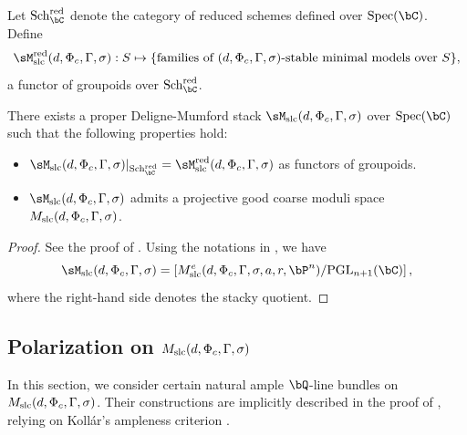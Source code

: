 \documentclass[11pt,letterpaper]{amsart}
\numberwithin{equation}{section}
\begin{document}
	Let ${\rm Sch}_{\bC}^{\rm red}$ denote the category of reduced schemes defined over ${\rm Spec}(\bC)$. Define  
	$$
	\sM^{\rm red}_{\rm slc}(d, \Phi_c, \Gamma, \sigma): S \mapsto \{\text{families of } (d, \Phi_c, \Gamma, \sigma)\text{-stable minimal models over } S\},
	$$  
	a functor of groupoids over ${\rm Sch}_{\bC}^{\rm red}$.  
	
	\begin{thm} \label{thm_moduli_stable_var}  
		There exists a proper Deligne-Mumford stack $\sM_{\rm slc}(d, \Phi_c, \Gamma, \sigma)$ over ${\rm Spec}(\bC)$ such that the following properties hold:  
		\begin{itemize}  
			\item $\sM_{\rm slc}(d, \Phi_c, \Gamma, \sigma)|_{{\rm Sch}_{\bC}^{\rm red}} = \sM^{\rm red}_{\rm slc}(d, \Phi_c, \Gamma, \sigma)$ as functors of groupoids.  
			\item $\sM_{\rm slc}(d, \Phi_c, \Gamma, \sigma)$ admits a projective good coarse moduli space $M_{\rm slc}(d, \Phi_c, \Gamma, \sigma)$.  
		\end{itemize}  
	\end{thm}  
	\begin{proof}  
		See the proof of \cite[Theorem 1.14]{Birkar2022}. Using the notations in \cite[\S 10.7]{Birkar2022}, we have  
		$$
		\sM_{\rm slc}(d, \Phi_c, \Gamma, \sigma) = \left[M_{\rm slc}^e(d, \Phi_c, \Gamma, \sigma, a, r, \bP^n)/{\rm PGL}_{n+1}(\bC)\right],
		$$  
		where the right-hand side denotes the stacky quotient.  
	\end{proof}
	\subsection{Polarization on $M_{\rm slc}(d,\Phi_c,\Gamma,\sigma)$}\label{section_polarization_moduli}
	In this section, we consider certain natural ample $\bQ$-line bundles on $M_{\rm slc}(d, \Phi_c, \Gamma, \sigma)$. Their constructions are implicitly described in the proof of \cite[Theorem 1.14]{Birkar2022}, relying on Koll\'ar's ampleness criterion \cite{Kollar1990}.  
	
\end{document}
